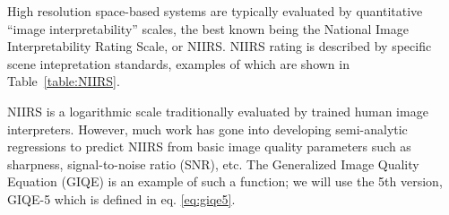 \documentclass[]{spieman}  %
\begin{document}
High resolution space-based systems are typically evaluated by quantitative ``image interpretability'' scales, the best known being the National Image Interpretability Rating Scale, or NIIRS.  NIIRS rating is described by specific scene intepretation standards, examples of which are shown in Table~\ref{table:NIIRS}\cite{niirs}.

\begin{table}[h!t]
\centering
\caption{Example NIIRS definitions}
\label{table:NIIRS}
\end{table}

NIIRS is a logarithmic scale traditionally evaluated by trained human image interpreters.  However, much work has gone into developing semi-analytic regressions to predict NIIRS from basic image quality parameters such as sharpness, signal-to-noise ratio (SNR), etc. The Generalized Image Quality Equation (GIQE) is an example of such a function; we will use the 5th version, GIQE-5 which is defined in eq. \eqref{eq:giqe5}.
\end{document}

